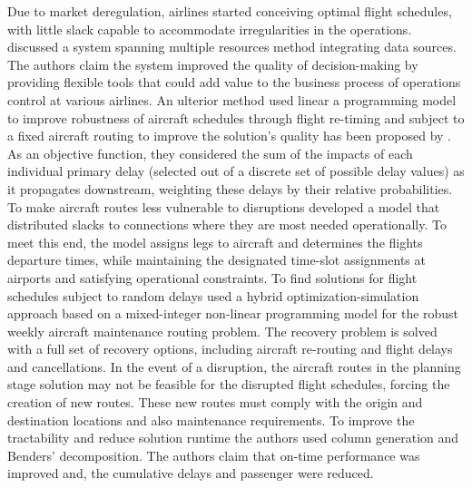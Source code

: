 \documentclass[ijoo,nonblindrev]{informs-ijoo}
\begin{document}
Due to market deregulation, airlines started conceiving optimal flight schedules, with little slack capable to accommodate irregularities in the operations. \citep{Kohl2007149} discussed a system spanning multiple resources method integrating data sources. The authors claim the system improved the quality of decision-making by providing flexible tools that could add value to the business process of operations control at various airlines. An ulterior method used linear a programming model to improve robustness of aircraft schedules through flight re-timing and subject to a fixed aircraft routing to improve the solution's quality has been proposed by \citep{AhmadBeygi2010}. As an objective function, they considered the sum of the impacts of each individual primary delay (selected out of a discrete set of possible delay values) as it propagates downstream, weighting these delays by their relative probabilities.
To make aircraft routes less vulnerable to disruptions \cite{Aloulou2013} developed a model that  distributed slacks to connections where they are most needed operationally. To meet this end, the model assigns legs to aircraft and determines the flights departure times, while maintaining the designated time-slot assignments at airports and satisfying operational constraints.
To find solutions for flight schedules subject to random delays \citep{Ahmed2017} used a hybrid optimization-simulation approach based on a mixed-integer non-linear programming model for the robust weekly aircraft maintenance routing problem. The recovery problem is solved with a full set of recovery options, including aircraft re-routing and flight delays and cancellations. In the event of a disruption, the aircraft routes in the planning stage solution may not be feasible for the disrupted flight schedules, forcing the creation of new routes. These new routes must comply with the origin and destination locations and also maintenance requirements. To improve the tractability and reduce solution runtime the authors used column generation and Benders' decomposition. The authors claim that on-time performance was improved and, the cumulative delays and passenger were reduced.
\end{document}
